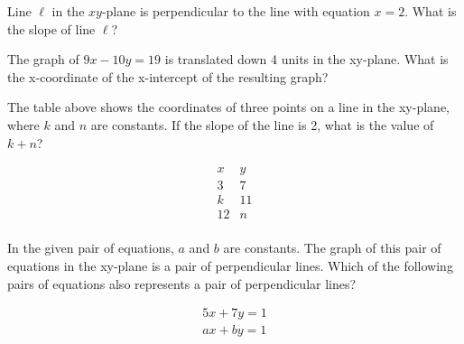 
\newpage
\noindent\markforreview

\vspace{1em}

Line $\ell$ in the $xy$-plane is perpendicular to the line with equation $x = 2$. What is the slope of line $\ell$?

\vspace{0.75em}



\vspace{5em}
\noindent\markforreview

\vspace{1em}

The graph of \( 9x - 10y = 19 \) is translated down 4 units in the xy-plane. What is the x-coordinate of the x-intercept of the resulting graph?


\vspace{5em}
\newpage
\noindent\markforreview

\vspace{1em}

The table above shows the coordinates of three points on a line in the xy-plane, where \( k \) and \( n \) are constants. If the slope of the line is 2, what is the value of \( k + n \)?

\[
\begin{array}{c|c}
x & y \\
\hline
3 & 7 \\
k & 11 \\
12 & n \\
\end{array}
\]

\vspace{5em}

\noindent\markforreview

\vspace{1em}

In the given pair of equations, \( a \) and \( b \) are constants. The graph of this pair of equations in the xy-plane is a pair of perpendicular lines. Which of the following pairs of equations also represents a pair of perpendicular lines?

\[
\begin{aligned}
5x + 7y = 1 \\
ax + by = 1 \\
\end{aligned}
\]

